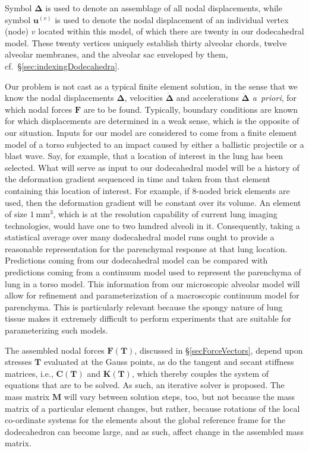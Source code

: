 Symbol $\boldsymbol{\Delta}$ is used to denote an assemblage of all nodal displacements, while symbol $\mathbf{u}^{(v)}$ is used to denote the nodal displacement of an individual vertex (node) $v$ located within this model, of which there are twenty in our dodecahedral model.  These twenty vertices uniquely establish thirty alveolar chords, twelve alveolar membranes, and the alveolar sac enveloped by them, cf.\ \S\ref{sec:indexingDodecahedra}.

Our problem is not cast as a typical finite element solution, in the sense that we know the nodal displacements $\boldsymbol{\Delta}$, velocities $\dot{\boldsymbol{\Delta}}$ and accelerations $\ddot{\boldsymbol{\Delta}}$ \textit{a~priori}, for which nodal forces $\boldsymbol{F}$ are to be found.  Typically, boundary conditions are known for which displacements are determined in a weak sense, which is the opposite of our situation. Inputs for our model are considered to come from a finite element model of a torso subjected to an impact caused by either a ballistic projectile or a blast wave.  Say, for example, that a location of interest in the lung has been selected.  What will serve as input to our dodecahedral model will be a history of the deformation gradient sequenced in time and taken from that element containing this location of interest.  For example, if 8-noded brick elements are used, then the deformation gradient will be constant over its volume.  An element of size $1~\text{mm}^3$, which is at the resolution capability of current lung imaging technologies, would have one to two hundred alveoli in it.  Consequently, taking a statistical average over many dodecahedral model runs ought to provide a reasonable representation for the parenchymal response at that lung location.  Predictions coming from our dodecahedral model can be compared with predictions coming from a continuum model used to represent the parenchyma of lung in a torso model.  This information from our micro\-scopic alveolar model will allow for refinement and parameterization of a macro\-scopic continuum model for parenchyma.  This is particularly relevant because the spongy nature of lung tissue makes it extremely difficult to perform experiments that are suitable for parameterizing such models.

The assembled nodal forces $\boldsymbol{F}(\boldsymbol{T})$, discussed in \S\ref{secForceVectors}, depend upon stresses $\boldsymbol{T}$ evaluated at the Gauss points, as do the tangent and secant stiffness matrices, i.e., $\mathbf{C}(\boldsymbol{T})$ and $\mathbf{K}(\boldsymbol{T})$, which thereby couples the system of equations that are to be solved.  As such, an iterative solver is proposed.  The mass matrix $\mathbf{M}$ will vary between solution steps, too, but not because the mass matrix of a particular element changes, but rather, because rotations of the local co-ordinate systems for the elements about the global reference frame for the dodecahedron can become large, and as such, affect change in the assembled mass matrix.

